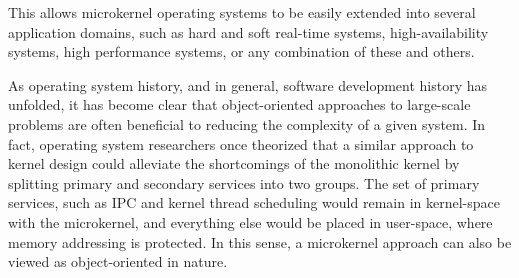 %
%
%
This allows microkernel operating
systems to be easily extended into several application domains, such as
hard and soft real-time systems, high-availability systems, high
performance systems, or any combination of these and
others.

As operating system history, and in general, software development
history has unfolded, it has become clear that object-oriented
approaches to large-scale problems are often beneficial to reducing
the complexity of a given system.  In fact, operating system
researchers once theorized that a similar approach to kernel design
could alleviate the shortcomings of the monolithic kernel by splitting
primary and secondary services into two groups.  The set of primary
services, such as IPC and kernel thread scheduling would remain in
kernel-space with the microkernel, and everything else would be placed
in user-space, where memory addressing is protected. In this sense, a
microkernel approach can also be viewed as object-oriented in nature.


